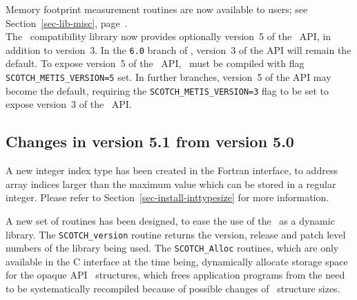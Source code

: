 Memory footprint measurement routines are now available to users;
see Section~\ref{sec-lib-misc}, page~\pageref{sec-lib-misc}.
\\

The \metis\ compatibility library now provides optionally version~5 of
the \metis\ API, in addition to version~3. In the \texttt{6.0} branch
of \scotch, version~3 of the API will remain the default. To expose
version~5 of the \metis\ API, \scotch\ must be compiled with flag
\texttt{SCOTCH\_\lbt METIS\_\lbt VERSION=5} set. In further branches,
version~5 of the API may become the default, requiring the
\texttt{SCOTCH\_\lbt METIS\_\lbt VERSION=3} flag to be set to expose
version~3 of the \metis\ API.

\subsection{Changes in version 5.1 from version 5.0}

A new integer index type has been created in the Fortran interface, to
address array indices larger than the maximum value which can be
stored in a regular integer. Please refer to
Section~\ref{sec-install-inttypesize} for more information.

A new set of routines has been designed, to ease the use of the
\libscotch\ as a dynamic library. The \texttt{SCOTCH\_\lbt version}
routine returns the version, release and patch level numbers of the
library being used. The \texttt{SCOTCH\_\lbt *Alloc} routines,
which are only available in the C interface at the time being,
dynamically allocate storage space for the opaque API
\scotch\ structures, which frees application programs from the need
to be systematically recompiled because of possible changes of
\scotch\ structure sizes.
